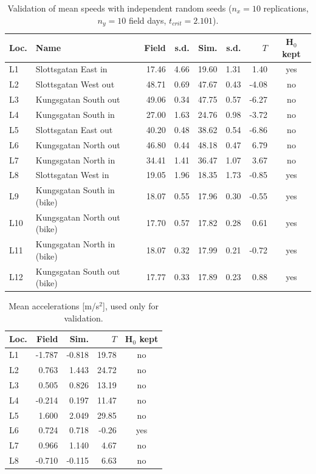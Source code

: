\begin{table}[H]
\centering
\caption{Validation of mean speeds with independent random seeds ($n_x=10$ replications, $n_y=10$ field days, $t_{crit}=2.101$).}
\begin{tabular}{llrrrrrc}
\toprule
\textbf{Loc.} & \textbf{Name} & \textbf{Field} & \textbf{s.d.} & \textbf{Sim.} & \textbf{s.d.} & $T$ & \textbf{H$_0$ kept}\\
\midrule
L1 & Slottsgatan East in & 17.46 & 4.66 & 19.60 & 1.31 & 1.40 & yes\\
L2 & Slottsgatan West out & 48.71 & 0.69 & 47.67 & 0.43 & -4.08 & no\\
L3 & Kungsgatan South out & 49.06 & 0.34 & 47.75 & 0.57 & -6.27 & no\\
L4 & Kungsgatan South in & 27.00 & 1.63 & 24.76 & 0.98 & -3.72 & no\\
L5 & Slottsgatan East out & 40.20 & 0.48 & 38.62 & 0.54 & -6.86 & no\\
L6 & Kungsgatan North out & 46.80 & 0.44 & 48.18 & 0.47 & 6.79 & no\\
L7 & Kungsgatan North in & 34.41 & 1.41 & 36.47 & 1.07 & 3.67 & no\\
L8 & Slottsgatan West in & 19.05 & 1.96 & 18.35 & 1.73 & -0.85 & yes\\
L9 & Kungsgatan South in (bike) & 18.07 & 0.55 & 17.96 & 0.30 & -0.55 & yes\\
L10 & Kungsgatan North out (bike) & 17.70 & 0.57 & 17.82 & 0.28 & 0.61 & yes\\
L11 & Kungsgatan North in (bike) & 18.07 & 0.32 & 17.99 & 0.21 & -0.72 & yes\\
L12 & Kungsgatan South out (bike) & 17.77 & 0.33 & 17.89 & 0.23 & 0.88 & yes\\
\bottomrule
\end{tabular}
\end{table}

\begin{table}[H]
\centering
\caption{Mean accelerations [m/s$^2$], used only for validation.}
\begin{tabular}{lrrrc}
\toprule
\textbf{Loc.} & \textbf{Field} & \textbf{Sim.} & $T$ & \textbf{H$_0$ kept}\\
\midrule
L1 & -1.787 & -0.818 & 19.78 & no\\
L2 & 0.763 & 1.443 & 24.72 & no\\
L3 & 0.505 & 0.826 & 13.19 & no\\
L4 & -0.214 & 0.197 & 11.47 & no\\
L5 & 1.600 & 2.049 & 29.85 & no\\
L6 & 0.724 & 0.718 & -0.26 & yes\\
L7 & 0.966 & 1.140 & 4.67 & no\\
L8 & -0.710 & -0.115 & 6.63 & no\\
\bottomrule
\end{tabular}
\end{table}